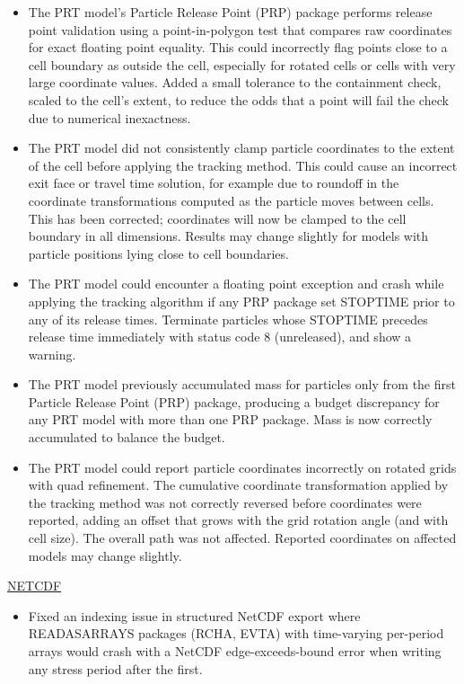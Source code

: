 \begin{itemize}
\item The PRT model's Particle Release Point (PRP) package performs release point validation using a point-in-polygon test that compares raw coordinates for exact floating point equality. This could incorrectly flag points close to a cell boundary as outside the cell, especially for rotated cells or cells with very large coordinate values. Added a small tolerance to the containment check, scaled to the cell's extent, to reduce the odds that a point will fail the check due to numerical inexactness.
\item The PRT model did not consistently clamp particle coordinates to the extent of the cell before applying the tracking method. This could cause an incorrect exit face or travel time solution, for example due to roundoff in the coordinate transformations computed as the particle moves between cells. This has been corrected; coordinates will now be clamped to the cell boundary in all dimensions. Results may change slightly for models with particle positions lying close to cell boundaries.
\item The PRT model could encounter a floating point exception and crash while applying the tracking algorithm if any PRP package set STOPTIME prior to any of its release times. Terminate particles whose STOPTIME precedes release time immediately with status code 8 (unreleased), and show a warning.
\item The PRT model previously accumulated mass for particles only from the first Particle Release Point (PRP) package, producing a budget discrepancy for any PRT model with more than one PRP package. Mass is now correctly accumulated to balance the budget.
\item The PRT model could report particle coordinates incorrectly on rotated grids with quad refinement. The cumulative coordinate transformation applied by the tracking method was not correctly reversed before coordinates were reported, adding an offset that grows with the grid rotation angle (and with cell size). The overall path was not affected. Reported coordinates on affected models may change slightly.
\end{itemize}

\underline{NETCDF}
\begin{itemize}
\item Fixed an indexing issue in structured NetCDF export where READASARRAYS packages (RCHA, EVTA) with time-varying per-period arrays would crash with a NetCDF edge-exceeds-bound error when writing any stress period after the first.
\end{itemize}

